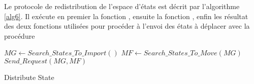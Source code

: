Le protocole de redistribution de l'espace d'états est décrit par l'algorithme \ref{alg6}. Il exécute en premier la fonction , ensuite la fonction , enfin les résultat des deux fonctions utilisées pour procéder à l'envoi des états à déplacer avec la procédure  \\
\begin{algorithm}[H]
\SetAlgoLined
	$MG\longleftarrow Search\_ States\_ To\_ Import()$\;
	$MF\longleftarrow Search\_ States\_ To\_ Move(MG)$\;
	$Send\_ Request(MG,MF)$\;
	\caption{Distribute State}\label{alg6}
\end{algorithm}
